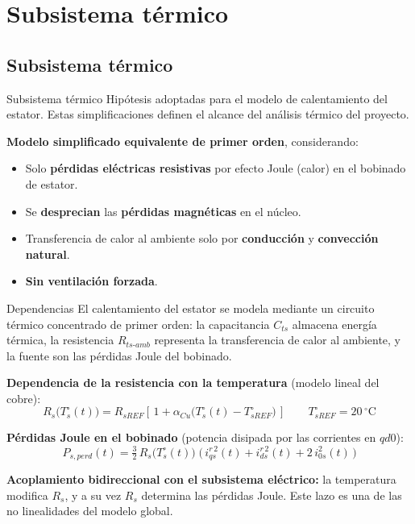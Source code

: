 \documentclass[aspectratio=169,t]{beamer}
\newcommand{\SecPresentacion}{Presentación del problema}
\newcommand{\SecMecanico}{Subsistema mecánico equivalente}
\newcommand{\SecElectromagnetico}{Subsistema electromagnético en coordenadas qd0}
\newcommand{\SecTermico}{Subsistema térmico}
\newcommand{\SecNLGlobal}{Sistema No Lineal Global}
\newcommand{\SecLPV}{Linealización Jacobiana (LPV)}
\newcommand{\SecLTI}{Obtención del modelo LTI equivalente}
\newcommand{\SecAnalisisLTI}{Análisis del modelo LTI aumentado}
\newcommand{\SecDinamica}{Respuesta dinámica en dominio del tiempo}
\newcommand{\SecControlador}{Diseño y análisis del controlador en cascada}
\newcommand{\SecVerifSpecs}{Verificación de desempeño: Especificaciones de operación}
\newcommand{\SecVerifOffset}{Verificación de desempeño: Offset de estado estacionario}
\newcommand{\SecVerifNoIdealidades}{Verificación de desempeño: No idealidades y comportamiento térmico}
\newcommand{\SecDiscretizacion}{Discretización del controlador}
\newcommand{\SecSoftware}{Codificación del software de control}
\newcommand{\AgendaItem}[3]{%
  \ifnum#1=#2
    {\scriptsize\bfseries\color{uncBlue}%
      \hyperlink{sec:#1}{\makebox[2.2em][r]{#1.}\hspace{0.7em}%
      \parbox[t]{0.86\textwidth}{#3}}\par}%
  \else
    {\scriptsize\color{black!26}%
      \hyperlink{sec:#1}{\makebox[2.2em][r]{#1.}\hspace{0.7em}%
      \parbox[t]{0.86\textwidth}{#3}}\par}%
  \fi
  \vspace{0.35mm}%
}
\newcommand{\AgendaBody}[1]{%
    \vspace{3mm}
    {\Large\bfseries\color{uncBlue}Tabla de contenidos\par}
    \vspace{2mm}
    \begin{minipage}{0.94\textwidth}
      \AgendaItem{1}{#1}{\SecPresentacion}
      \AgendaItem{2}{#1}{\SecMecanico}
      \AgendaItem{3}{#1}{\SecElectromagnetico}
      \AgendaItem{4}{#1}{\SecTermico}
      \AgendaItem{5}{#1}\SecNLGlobal
      \AgendaItem{6}{#1}{\SecLPV}
      \AgendaItem{7}{#1}{\SecLTI}
      \AgendaItem{8}{#1}{\SecAnalisisLTI}
      \AgendaItem{9}{#1}{\SecDinamica}
      \AgendaItem{10}{#1}{\SecControlador}
      \AgendaItem{11}{#1}{\SecVerifSpecs}
      \AgendaItem{12}{#1}{\SecVerifOffset}
      \AgendaItem{13}{#1}{\SecVerifNoIdealidades}
      \AgendaItem{14}{#1}{\SecDiscretizacion}
      \AgendaItem{15}{#1}{\SecSoftware}
    \end{minipage}
    \vfill
}
\newcommand{\AgendaSlideTarget}[2]{%
  \begin{frame}[plain]
    \hypertarget{#2}{}%
    \AgendaBody{#1}
  \end{frame}
}
\newcommand{\StartProjectSection}[2]{%
  \section{#2}%
  \subsection{#2}%
  \AgendaSlideTarget{#1}{sec:#1}%
}
\begin{document}
\StartProjectSection{4}{\SecTermico}
\begin{frame}{Subsistema térmico}
{\small\color{uncGray}Hipótesis adoptadas para el modelo de calentamiento del estator. Estas simplificaciones definen el alcance del análisis térmico del proyecto.}\par
\vspace{6mm}

\textbf{Modelo simplificado equivalente de primer orden}, considerando:
\begin{itemize}
\item Solo \textbf{pérdidas eléctricas resistivas} por efecto Joule (calor) en el bobinado de estator.
\item Se \textbf{desprecian} las \textbf{pérdidas magnéticas} en el núcleo.
\item Transferencia de calor al ambiente solo por \textbf{conducción} y \textbf{convección natural}.
\item \textbf{Sin ventilación forzada}.
\end{itemize}
\end{frame}

\begin{frame}{Dependencias}
{\small\color{uncGray}El calentamiento del estator se modela mediante un circuito térmico concentrado de primer orden: la capacitancia $C_{ts}$ almacena energía térmica, la resistencia $R_{ts\text{-}amb}$ representa la transferencia de calor al ambiente, y la fuente son las pérdidas Joule del bobinado.}\par
\vspace{4mm}

\textbf{Dependencia de la resistencia con la temperatura} (modelo lineal del cobre):
\begin{equation*}
R_s\!\big(T_s^\circ(t)\big) = R_{sREF}\!\left[\,1 + \alpha_{Cu}\!\big(T_s^\circ(t) - T_{sREF}^\circ\big)\,\right]
\qquad T_{sREF}^\circ = 20\,^\circ\text{C}
\end{equation*}

\textbf{Pérdidas Joule en el bobinado} (potencia disipada por las corrientes en $qd0$):
\begin{equation*}
P_{s,perd}(t) = \tfrac{3}{2}\,R_s\!\big(T_s^\circ(t)\big)\;\big(\,i_{qs}^{r\,2}(t) + i_{ds}^{r\,2}(t) + 2\,i_{0s}^{2}(t)\,\big)
\end{equation*}

\vspace{2mm}
{\small \textbf{Acoplamiento bidireccional con el subsistema eléctrico:} la temperatura modifica $R_s$, y a su vez $R_s$ determina las pérdidas Joule. Este lazo es una de las no linealidades del modelo global.}
\end{frame}
\end{document}
